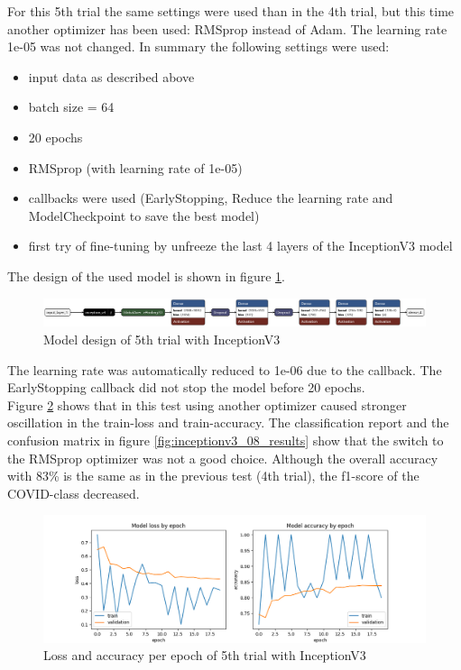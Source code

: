 \documentclass{article}
\begin{document}
For this 5th trial the same settings were used than in the 4th trial, but this time another optimizer has been used: RMSprop instead of Adam. The learning rate 1e-05 was not changed. 
In summary the following settings were used: 
\begin{itemize}
\item input data as described above
\item batch size = 64
\item 20 epochs 
\item RMSprop (with learning rate of 1e-05)
\item callbacks were used (EarlyStopping, Reduce the learning rate and ModelCheckpoint to save the best model)
\item first try of fine-tuning by unfreeze the last 4 layers of the InceptionV3 model
\end{itemize}

The design of the used model is shown in figure \ref{fig:inceptionv3_08.keras_model_design}.
\begin{figure}%
    \centering
    \includegraphics[width=1.0\linewidth]{inceptionv3_08.keras_model_design_nice.png}
    \caption{Model design of 5th trial with InceptionV3}
    \label{fig:inceptionv3_08.keras_model_design}
\end{figure}

The learning rate was automatically reduced to 1e-06 due to the callback. The EarlyStopping callback did not stop the model before 20 epochs.\\
Figure \ref{fig:inceptionv3_08_loss_accuracy} shows that in this test using another optimizer caused stronger oscillation in the train-loss and train-accuracy. The classification report and the confusion matrix in figure \ref{fig:inceptionv3_08_results} show that the switch to the RMSprop optimizer was not a good choice. Although the overall accuracy with 83\% is the same as in the previous test (4th trial), the f1-score of the COVID-class decreased.\\ 

\begin{figure}%
    \centering
    \includegraphics[width=1.0\linewidth]{inceptionv3_08_loss_accuracy.png}
    \caption{Loss and accuracy per epoch of 5th trial with InceptionV3}
    \label{fig:inceptionv3_08_loss_accuracy}
\end{figure}
\end{document}
